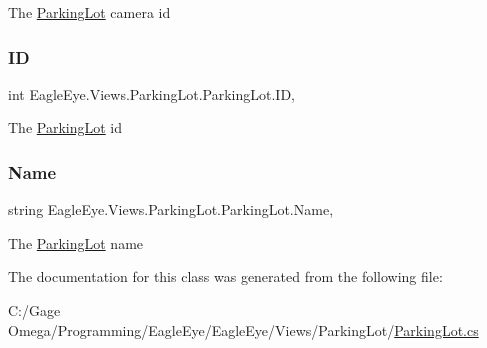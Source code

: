 The \mbox{\hyperlink{class_eagle_eye_1_1_views_1_1_parking_lot_1_1_parking_lot}{Parking\+Lot}} camera id 

\mbox{\label{class_eagle_eye_1_1_views_1_1_parking_lot_1_1_parking_lot_a577b278535b3599ca2aeb7ad17232f76}} 
\subsubsection{\texorpdfstring{ID}{ID}}
{\footnotesize\ttfamily int Eagle\+Eye.\+Views.\+Parking\+Lot.\+Parking\+Lot.\+ID\hspace{0.3cm}{\ttfamily [get]}, {\ttfamily [set]}}



The \mbox{\hyperlink{class_eagle_eye_1_1_views_1_1_parking_lot_1_1_parking_lot}{Parking\+Lot}} id 

\mbox{\label{class_eagle_eye_1_1_views_1_1_parking_lot_1_1_parking_lot_afad744515e8684f99befb40034fda405}} 
\subsubsection{\texorpdfstring{Name}{Name}}
{\footnotesize\ttfamily string Eagle\+Eye.\+Views.\+Parking\+Lot.\+Parking\+Lot.\+Name\hspace{0.3cm}{\ttfamily [get]}, {\ttfamily [set]}}



The \mbox{\hyperlink{class_eagle_eye_1_1_views_1_1_parking_lot_1_1_parking_lot}{Parking\+Lot}} name 



The documentation for this class was generated from the following file\+:\begin{DoxyCompactItemize}
\item 
C\+:/\+Gage Omega/\+Programming/\+Eagle\+Eye/\+Eagle\+Eye/\+Views/\+Parking\+Lot/\mbox{\hyperlink{_views_2_parking_lot_2_parking_lot_8cs}{Parking\+Lot.\+cs}}\end{DoxyCompactItemize}
